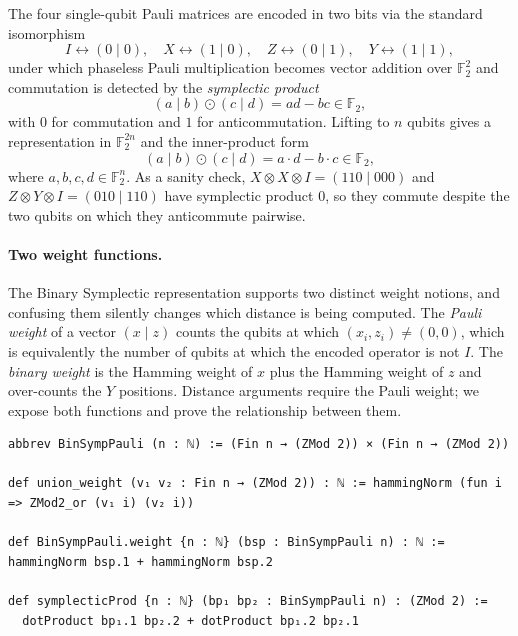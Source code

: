 The four single-qubit Pauli matrices are encoded in two bits via the standard
isomorphism
$$I \leftrightarrow (0 \mid 0), \quad X \leftrightarrow (1 \mid 0), \quad Z
\leftrightarrow (0 \mid 1), \quad Y \leftrightarrow (1 \mid 1),$$
under which phaseless Pauli multiplication becomes vector addition over
$\mathbb{F}_2^2$ and commutation is detected by the \emph{symplectic product}
$$(a \mid b) \odot (c \mid d) = ad - bc \in \mathbb{F}_2,$$
with $0$ for commutation and $1$ for anticommutation. Lifting to $n$ qubits
gives a representation in $\mathbb{F}_2^{2n}$ and the inner-product form
$$(a \mid b) \odot (c \mid d) = a \cdot d - b \cdot c \in \mathbb{F}_2,$$
where $a, b, c, d \in \mathbb{F}_2^n$. As a sanity check, $X \otimes X \otimes I
= (110 \mid 000)$ and $Z \otimes Y \otimes I = (010 \mid 110)$ have symplectic
product $0$, so they commute despite the two qubits on which they anticommute
pairwise.

\paragraph{Two weight functions.} The Binary Symplectic representation supports
two distinct weight notions, and confusing them silently changes which distance
is being computed. The \emph{Pauli weight} of a vector $(x \mid z)$ counts the
qubits at which $(x_i, z_i) \neq (0, 0)$, which is equivalently the number of qubits
at which the encoded operator is not $I$. The \emph{binary weight} is the
Hamming weight of $x$ plus the Hamming weight of $z$ and over-counts the $Y$
positions. Distance arguments require the Pauli weight; we expose both functions
and prove the relationship between them.

\begin{lstlisting}
abbrev BinSympPauli (n : ℕ) := (Fin n → (ZMod 2)) × (Fin n → (ZMod 2))

def union_weight (v₁ v₂ : Fin n → (ZMod 2)) : ℕ := hammingNorm (fun i => ZMod2_or (v₁ i) (v₂ i))

def BinSympPauli.weight {n : ℕ} (bsp : BinSympPauli n) : ℕ := hammingNorm bsp.1 + hammingNorm bsp.2

def symplecticProd {n : ℕ} (bp₁ bp₂ : BinSympPauli n) : (ZMod 2) :=
  dotProduct bp₁.1 bp₂.2 + dotProduct bp₁.2 bp₂.1
\end{lstlisting}

%

